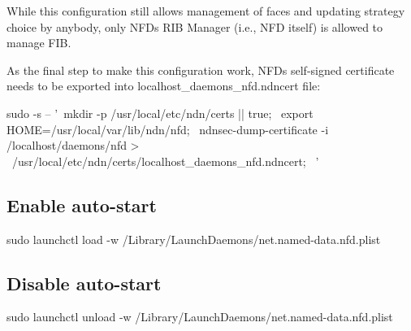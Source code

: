 While this configuration still allows management of faces and updating strategy choice by anybody, only N\+FD\textquotesingle{}s R\+IB Manager (i.\+e., N\+FD itself) is allowed to manage F\+IB.

As the final step to make this configuration work, N\+FD\textquotesingle{}s self-\/signed certificate needs to be exported into {\ttfamily localhost\+\_\+daemons\+\_\+nfd.\+ndncert} file\+: \begin{DoxyVerb}sudo -s -- '\
  mkdir -p /usr/local/etc/ndn/certs || true; \
  export HOME=/usr/local/var/lib/ndn/nfd; \
  ndnsec-dump-certificate -i /localhost/daemons/nfd > \
    /usr/local/etc/ndn/certs/localhost_daemons_nfd.ndncert; \
  '
\end{DoxyVerb}


\subsection*{Enable auto-\/start }

\begin{DoxyVerb}sudo launchctl load -w /Library/LaunchDaemons/net.named-data.nfd.plist
\end{DoxyVerb}


\subsection*{Disable auto-\/start }

\begin{DoxyVerb}sudo launchctl unload -w /Library/LaunchDaemons/net.named-data.nfd.plist\end{DoxyVerb}
 